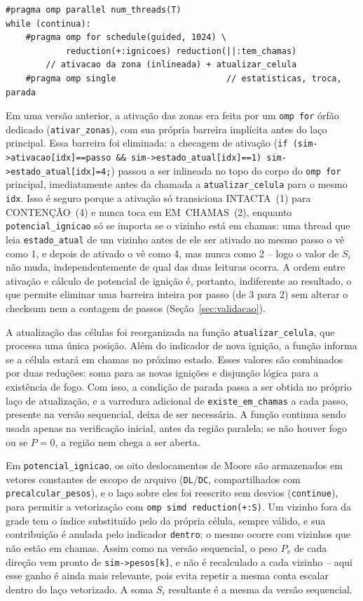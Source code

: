 \documentclass[12pt,a4paper]{article}
\begin{document}
\begin{lstlisting}
#pragma omp parallel num_threads(T)
while (continua):
    #pragma omp for schedule(guided, 1024) \
            reduction(+:ignicoes) reduction(||:tem_chamas)
        // ativacao da zona (inlineada) + atualizar_celula
    #pragma omp single                      // estatisticas, troca, parada
\end{lstlisting}

Em uma versão anterior, a ativação das zonas era feita por um
\texttt{omp for} órfão dedicado (\texttt{ativar\_zonas}), com sua
própria barreira implícita antes do laço principal. Essa barreira foi
eliminada: a checagem de ativação (\texttt{if
(sim->ativacao[idx]==passo \&\& sim->estado\_atual[idx]==1)
sim->estado\_atual[idx]=4;}) passou a ser inlineada no topo do corpo do
\texttt{omp for} principal, imediatamente antes da chamada a
\texttt{atualizar\_celula} para o mesmo \texttt{idx}. Isso é seguro
porque a ativação só transiciona INTACTA~(1) para CONTENÇÃO~(4) e nunca
toca em EM~CHAMAS~(2), enquanto \texttt{potencial\_ignicao} só se
importa se o vizinho está em chamas: uma thread que leia
\texttt{estado\_atual} de um vizinho antes de ele ser ativado no mesmo
passo o vê como 1, e depois de ativado o vê como 4, mas nunca como 2 --
logo o valor de $S_i$ não muda, independentemente de qual das duas
leituras ocorra. A ordem entre ativação e cálculo de potencial de
ignição é, portanto, indiferente ao resultado, o que permite eliminar
uma barreira inteira por passo (de 3 para 2) sem alterar o checksum nem
a contagem de passos (Seção~\ref{sec:validacao}).

A atualização das células foi reorganizada na função
\texttt{atualizar\_celula}, que processa uma única posição.
Além do indicador de nova ignição, a função informa se a célula estará
em chamas no próximo estado. Esses valores são combinados por duas
reduções: soma para as novas ignições e disjunção lógica para a
existência de fogo. Com isso, a condição de parada passa a ser obtida
no próprio laço de atualização, e a varredura adicional de
\texttt{existe\_em\_chamas} a cada passo, presente na versão sequencial,
deixa de ser necessária. A função continua sendo usada apenas na
verificação inicial, antes da região paralela; se não houver fogo ou se
$P=0$, a região nem chega a ser aberta.

Em \texttt{potencial\_ignicao}, os oito deslocamentos de Moore são
armazenados em vetores constantes de escopo de arquivo
(\texttt{DL}/\texttt{DC}, compartilhados com \texttt{precalcular\_pesos}),
e o laço sobre eles foi reescrito sem desvios (\texttt{continue}), para
permitir a vetorização com \texttt{omp simd reduction(+:S)}. Um vizinho
fora da grade tem o índice substituído pelo da própria célula, sempre
válido, e sua contribuição é anulada pelo indicador \texttt{dentro}; o
mesmo ocorre com vizinhos que não estão em chamas. Assim como na versão
sequencial, o peso $P_v$ de cada direção vem pronto de
\texttt{sim->pesos[k]}, e não é recalculado a cada vizinho -- aqui esse
ganho é ainda mais relevante, pois evita repetir a mesma conta escalar
dentro do laço vetorizado. A soma $S_i$ resultante é a mesma da versão
sequencial.
\end{document}
